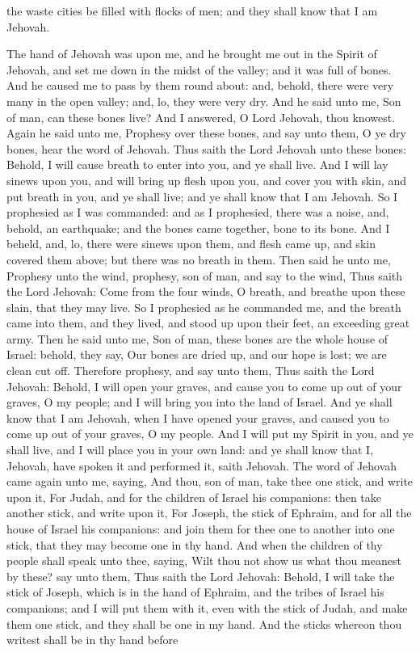 the waste cities be filled with flocks of men; and they shall know that I am Jehovah. 

The hand of Jehovah was upon me, and he brought me out in the Spirit of Jehovah, and set me down in the midst of the valley; and it was full of bones. And he caused me to pass by them round about: and, behold, there were very many in the open valley; and, lo, they were very dry. And he said unto me, Son of man, can these bones live? And I answered, O Lord Jehovah, thou knowest. Again he said unto me, Prophesy over these bones, and say unto them, O ye dry bones, hear the word of Jehovah. Thus saith the Lord Jehovah unto these bones: Behold, I will cause breath to enter into you, and ye shall live. And I will lay sinews upon you, and will bring up flesh upon you, and cover you with skin, and put breath in you, and ye shall live; and ye shall know that I am Jehovah.  So I prophesied as I was commanded: and as I prophesied, there was a noise, and, behold, an earthquake; and the bones came together, bone to its bone. And I beheld, and, lo, there were sinews upon them, and flesh came up, and skin covered them above; but there was no breath in them. Then said he unto me, Prophesy unto the wind, prophesy, son of man, and say to the wind, Thus saith the Lord Jehovah: Come from the four winds, O breath, and breathe upon these slain, that they may live. So I prophesied as he commanded me, and the breath came into them, and they lived, and stood up upon their feet, an exceeding great army.  Then he said unto me, Son of man, these bones are the whole house of Israel: behold, they say, Our bones are dried up, and our hope is lost; we are clean cut off. Therefore prophesy, and say unto them, Thus saith the Lord Jehovah: Behold, I will open your graves, and cause you to come up out of your graves, O my people; and I will bring you into the land of Israel. And ye shall know that I am Jehovah, when I have opened your graves, and caused you to come up out of your graves, O my people. And I will put my Spirit in you, and ye shall live, and I will place you in your own land: and ye shall know that I, Jehovah, have spoken it and performed it, saith Jehovah.  The word of Jehovah came again unto me, saying, And thou, son of man, take thee one stick, and write upon it, For Judah, and for the children of Israel his companions: then take another stick, and write upon it, For Joseph, the stick of Ephraim, and for all the house of Israel his companions: and join them for thee one to another into one stick, that they may become one in thy hand. And when the children of thy people shall speak unto thee, saying, Wilt thou not show us what thou meanest by these? say unto them, Thus saith the Lord Jehovah: Behold, I will take the stick of Joseph, which is in the hand of Ephraim, and the tribes of Israel his companions; and I will put them with it, even with the stick of Judah, and make them one stick, and they shall be one in my hand. And the sticks whereon thou writest shall be in thy hand before 